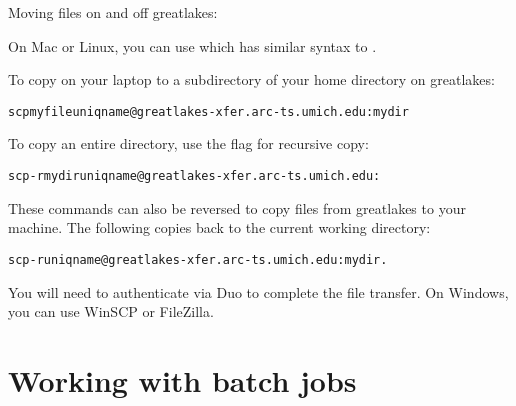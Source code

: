 \begin{frame}[fragile]{Moving files on and off greatlakes: }

On Mac or Linux, you can use  which has similar syntax to .

To copy  on your laptop to a subdirectory  of your home directory on greatlakes:
\begin{knitrout}\small
{}\color{fgcolor}\begin{kframe}
\begin{alltt}
scp myfile uniqname@greatlakes-xfer.arc-ts.umich.edu:mydir
\end{alltt}
\end{kframe}
\end{knitrout}
To copy an entire directory, use the  flag for recursive copy:
\begin{knitrout}\small
{}\color{fgcolor}\begin{kframe}
\begin{alltt}
scp -r mydir uniqname@greatlakes-xfer.arc-ts.umich.edu:
\end{alltt}
\end{kframe}
\end{knitrout}
These commands can also be reversed to copy files from greatlakes to your machine. The following copies  back to the current working directory:
\begin{knitrout}\small
{}\color{fgcolor}\begin{kframe}
\begin{alltt}
scp -r uniqname@greatlakes-xfer.arc-ts.umich.edu:mydir .
\end{alltt}
\end{kframe}
\end{knitrout}
You will need to authenticate via Duo to complete the file transfer.
On Windows, you can use WinSCP or FileZilla. 
\end{frame}

\section{Working with batch jobs}


